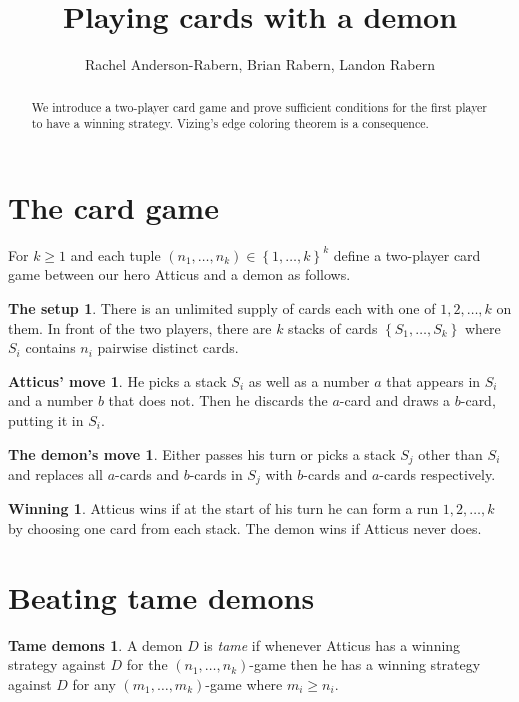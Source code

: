 \documentclass[12pt]{article}
\title{Playing cards with a demon}
\author{Rachel Anderson-Rabern, Brian Rabern, Landon Rabern}
\theoremstyle{plain}
\theoremstyle{definition}
\newtheorem*{setup}{The setup}
\newtheorem*{atticus}{Atticus' move}
\newtheorem*{demon}{The demon's move}
\newtheorem*{winning}{Winning}
\newtheorem*{tame}{Tame demons}
\theoremstyle{remark}
\newcommand{\set}[1]{\left\{ #1 \right\}}
\begin{document}
\maketitle
\begin{abstract}
We introduce a two-player card game and prove sufficient conditions for the first player to have a winning strategy.  Vizing's edge coloring theorem is a consequence.
\end{abstract}

\section{The card game}
For $k \geq 1$ and each tuple $(n_1, \ldots, n_k) \in \set{1, \ldots, k}^k$ define a two-player card game between our hero Atticus and a demon as follows.

\begin{setup}
There is an unlimited supply of cards each with one of $1, 2, \ldots, k$ on them. In front of the two players, there are $k$
stacks of cards $\set{S_1, \ldots, S_k}$ where $S_i$ contains $n_i$ pairwise distinct cards.
\end{setup}

\begin{atticus}
He picks a stack $S_i$ as well as a number $a$ that appears in $S_i$ and a number $b$ that does not.  Then he discards the $a$-card and draws a $b$-card, putting it in $S_i$.
\end{atticus}

\begin{demon}
Either passes his turn or picks a stack $S_j$ other than $S_i$ and replaces all $a$-cards and $b$-cards in $S_j$ with $b$-cards and $a$-cards respectively.
\end{demon}

\begin{winning}
Atticus wins if at the start of his turn he can form a run $1, 2, \ldots, k$ by choosing one card from each stack.  The demon wins if Atticus never does.
\end{winning}

\section{Beating tame demons}
\begin{tame}
A demon $D$ is \emph{tame} if whenever Atticus has a winning strategy against $D$ for the $(n_1, \ldots, n_k)$-game then he has a winning strategy against $D$ for any $(m_1, \ldots, m_k)$-game where $m_i \geq n_i$.
\end{tame}
\end{document}
